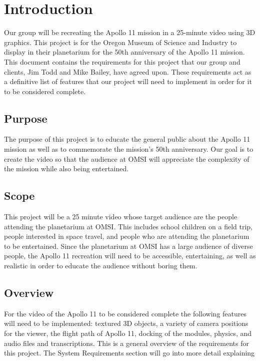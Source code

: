 \documentclass[onecolumn, draftclsnofoot,10pt, compsoc]{IEEEtran}
\begin{document}
\section{Introduction}
Our group will be recreating the Apollo 11 mission in a 25-minute video using 3D graphics. This project is for the Oregon Museum of Science and Industry to display in their planetarium for the 50th anniversary of the Apollo 11 mission. This document contains the requirements for this project that our group and clients, Jim Todd and Mike Bailey, have agreed upon. These requirements act as a definitive list of features that our project will need to implement in order for it to be considered complete. 
    \subsection{Purpose}
    The purpose of this project is to educate the general public about the Apollo 11 mission as well as to commemorate the mission's 50th anniversary. Our goal is to create the video so that the audience at OMSI will appreciate the complexity of the mission while also being entertained. 
    \subsection{Scope}
    This project will be a 25 minute video whose target audience are the people attending the planetarium at OMSI. This includes school children on a field trip, people interested in space travel, and people who are attending the planetarium to be entertained. Since the planetarium at OMSI has a large audience of diverse people, the Apollo 11 recreation will need to be accessible, entertaining, as well as realistic in order to educate the audience without boring them.
    \subsection{Overview}
    For the video of the Apollo 11 to be considered complete the following features will need to be implemented: textured 3D objects, a variety of camera positions for the viewer, the flight path of Apollo 11, docking of the modules, physics, and audio files and transcriptions. This is a general overview of the requirements for this project. The System Requirements section will go into more detail explaining  
\end{document}
